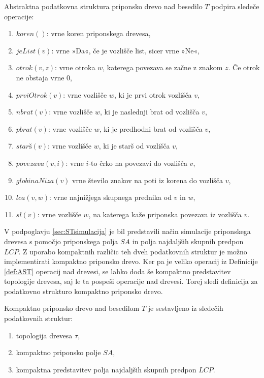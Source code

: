 \begin{defi}\label{def:AST}
    Abstraktna podatkovna struktura priponsko drevo nad besedilo $T$ podpira sledeče operacije:
    \begin{enumerate}
        \item $koren()$: vrne koren priponskega drevesa,
        \item $jeList(v)$: vrne »Da«, če je vozlišče list, sicer vrne »Ne«,
        \item $otrok(v,z)$: vrne otroka $w$, katerega povezava se začne z znakom $z$. Če otrok ne obstaja vrne 0,
        \item $prviOtrok(v)$: vrne vozlišče $w$, ki je prvi otrok vozlišča $v$,
        \item $nbrat(v)$: vrne vozlišče $w$, ki je naslednji brat od vozlišča $v$,
        \item $pbrat(v)$: vrne vozlišče $w$, ki je predhodni brat od vozlišča $v$,
        \item $star\textit{š}(v)$: vrne vozlišče $w$, ki je starš od vozlišča $v$,
        \item $povezava(v,i)$: vrne $i$-to črko na povezavi do vozlišča $v$,
        \item $globinaNiza(v)$ vrne število znakov na poti iz korena do vozlišča $v$,
        \item $lca(v,w)$: vrne najnižjega skupnega prednika od $v$ in $w$,
        \item $sl(v)$: vrne vozlišče $w$, na katerega kaže priponska povezava iz vozlišča $v$.
    \end{enumerate}
\end{defi}

V podpoglavju \ref{sec:STsimulacija} je bil predstavili način simulacije priponskega drevesa s pomočjo priponskega polja $SA$ in polja najdaljših skupnih predpon $LCP$. Z uporabo kompaktnih različic teh dveh podatkovnih struktur je možno implementirati kompaktno priponsko drevo. Ker pa je veliko operacij iz Definicije \ref{def:AST} operacij nad drevesi, se lahko doda še kompaktno predstavitev topologije drevesa, saj le ta pospeši operacije nad drevesi. Torej sledi definicija za podatkovno strukturo kompaktno priponsko drevo.

\begin{defi}
    Kompaktno priponsko drevo nad besedilom $T$ je sestavljeno iz sledečih podatkovnih struktur:
    \begin{enumerate}
        \item topologija drevesa $\tau$,
        \item kompaktno priponsko polje $SA$, %
        \item kompaktna predstavitev polja najdaljših skupnih predpon $LCP$.
    \end{enumerate}
\end{defi}

